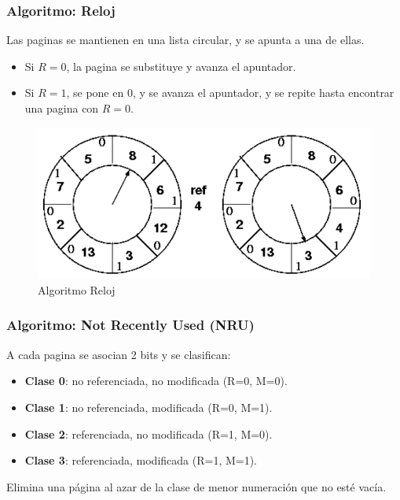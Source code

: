 \documentclass{beamer}
\newcommand{\algTitle}{\textbf{Algoritmo:} }
\begin{document}
\begin{frame}
	\frametitle{\algTitle Reloj}
	\footnotesize
	Las paginas se mantienen en una lista circular, y se apunta a una de ellas.
	\begin{itemize}
		\footnotesize
		\item Si $R = 0$, la pagina se substituye y avanza el apuntador.
		\item Si $R = 1$, se pone en 0, y se avanza el apuntador, y se repite hasta encontrar una pagina con $R = 0$.
	\end{itemize}
	
	\begin{figure}[H]
		\centering
		\includegraphics[scale=0.4]{img/reloj2.png}
		\caption{Algoritmo Reloj}
	\end{figure}
\end{frame}


\begin{frame}
	\frametitle{\algTitle Not Recently Used (NRU)}
	A cada pagina se asocian 2 bits y se clasifican:
	\begin{itemize}
		\footnotesize
		\item \textbf{Clase 0}: no referenciada, no modificada (R=0, M=0).
		\item \textbf{Clase 1}: no referenciada, modificada (R=0, M=1).
		\item \textbf{Clase 2}: referenciada, no modificada (R=1, M=0).
		\item \textbf{Clase 3}: referenciada, modificada (R=1, M=1).
	\end{itemize}
	 Elimina una página al azar de la clase de menor numeración que no esté vacía.
	

	
\end{frame}
\end{document}
